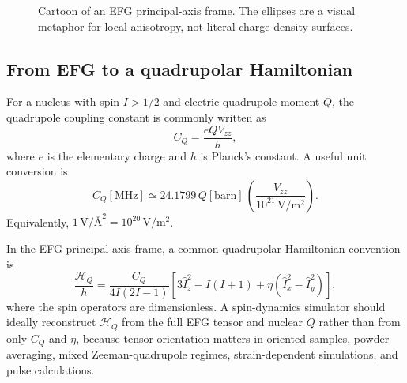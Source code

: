 \documentclass[11pt]{article}
\newcommand{\CQ}{C_Q}
\newcommand{\etaEFG}{\eta}
\begin{document}
\begin{figure}[H]
\centering
{}
\caption{Cartoon of an EFG principal-axis frame.  The ellipses are a visual metaphor for local anisotropy, not literal charge-density surfaces.}
\label{fig:efgaxes}
\end{figure}

\subsection{From EFG to a quadrupolar Hamiltonian}

For a nucleus with spin $I>1/2$ and electric quadrupole moment $Q$, the quadrupole coupling constant is commonly written as
\begin{equation}
\CQ = \frac{e Q V_{zz}}{h},
\label{eq:cqdef}
\end{equation}
where $e$ is the elementary charge and $h$ is Planck's constant.  A useful unit conversion is
\begin{equation}
\CQ[\mathrm{MHz}] \simeq 24.1799\, Q[\mathrm{barn}]\,
\left(\frac{V_{zz}}{10^{21}\,\mathrm{V/m^2}}\right).
\label{eq:unitconv}
\end{equation}
Equivalently, $1\,\mathrm{V}/\text{\AA}^{2}=10^{20}\,\mathrm{V/m^2}$.

In the EFG principal-axis frame, a common quadrupolar Hamiltonian convention is
\begin{equation}
\frac{\mathcal H_Q}{h}=
\frac{\CQ}{4I(2I-1)}
\left[3\hat I_z^2-I(I+1)+\etaEFG(\hat I_x^2-\hat I_y^2)\right],
\label{eq:hq}
\end{equation}
where the spin operators are dimensionless.  A spin-dynamics simulator should ideally reconstruct $\mathcal H_Q$ from the full EFG tensor and nuclear $Q$ rather than from only $\CQ$ and $\etaEFG$, because tensor orientation matters in oriented samples, powder averaging, mixed Zeeman-quadrupole regimes, strain-dependent simulations, and pulse calculations.
\end{document}
